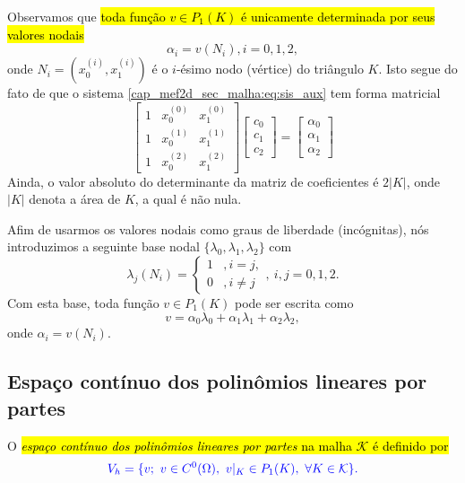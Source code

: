 Observamos que \hl{toda função $v\in P_1(K)$ é unicamente determinada por seus valores nodais} 
\begin{equation}\label{cap_mef2d_sec_malha:eq:sis_aux}
  \alpha_i = v(N_i), i=0, 1, 2,
\end{equation} 
onde $N_i = (x_0^{(i)}, x_1^{(i)})$ é o $i$-ésimo nodo (vértice) do triângulo $K$. Isto segue do fato de que o sistema \eqref{cap_mef2d_sec_malha:eq:sis_aux} tem forma matricial
\begin{equation}
  \begin{bmatrix}
    1 & x_0^{(0)} & x_1^{(0)}\\
    1 & x_0^{(1)} & x_1^{(1)}\\
    1 & x_0^{(2)} & x_1^{(2)}
  \end{bmatrix}
  \begin{bmatrix}
    c_0\\
    c_1\\
    c_2
  \end{bmatrix} = 
  \begin{bmatrix}
    \alpha_0\\
    \alpha_1\\
    \alpha_2
  \end{bmatrix}
\end{equation}
Ainda, o valor absoluto do determinante da matriz de coeficientes é $2|K|$, onde $|K|$ denota a área de $K$, a qual é não nula.

Afim de usarmos os valores nodais como graus de liberdade (incógnitas), nós introduzimos a seguinte base nodal $\{\lambda_0, \lambda_1, \lambda_2\}$ com
\begin{equation}
  \lambda_j(N_i) = \left\{
    \begin{array}{ll}
      1 &, i=j,\\
      0 &, i\neq j
    \end{array}
\right.,~i,j=0,1,2.
\end{equation}
Com esta base, toda função $v\in P_1(K)$ pode ser escrita como
\begin{equation}
  v = \alpha_0\lambda_0 + \alpha_1\lambda_1 + \alpha_2\lambda_2,
\end{equation}
onde $\alpha_i = v(N_i)$.

\subsection{Espaço contínuo dos polinômios lineares por partes}
\badgeRevisar

O \hl{\emph{espaço contínuo dos polinômios lineares por partes} na malha $\mathcal{K}$ é definido por}
\begin{equation}\color{blue}V_h = \{v;~v\in C^0(\Omega),~v|_K\in P_1(K),~\forall K\in\mathcal{K}\}.
\end{equation}

